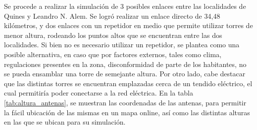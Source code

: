 \documentclass[11pt,a4paper]{article}
\begin{document}
Se procede a realizar la simulación de 3 posibles enlaces entre las localidades de Quines y Leandro N. Alem. 
Se logró realizar un enlace directo de 34,48 kilómetros, y dos enlaces con un repetidor en medio que permite utilizar torres de menor altura, rodeando los puntos altos que se encuentran entre las dos localidades. 
Si bien no es necesario utilizar un repetidor, se plantea como una posible alternativa, en caso que por factores externos, tales como clima, regulaciones presentes en la zona, disconformidad de parte de los habitantes, no se pueda ensamblar una torre de semejante altura.
Por otro lado, cabe destacar que las distintas torres se encuentran emplazadas cerca de un tendido eléctrico, el cual permitiría poder conectarse a la red eléctrica. 
En la tabla \ref{tab:altura_antenas}, se muestran las coordenadas de las antenas, para permitir la fácil ubicación de las mismas en un mapa online, así como las distintas alturas en las que se ubican para su simulación. 

\begin{table}[htbp]
    \caption{ubicación y altura de las antenas presentes en la simulación.}
    \label{tab:altura_antenas}%
\end{table}%
\end{document}
